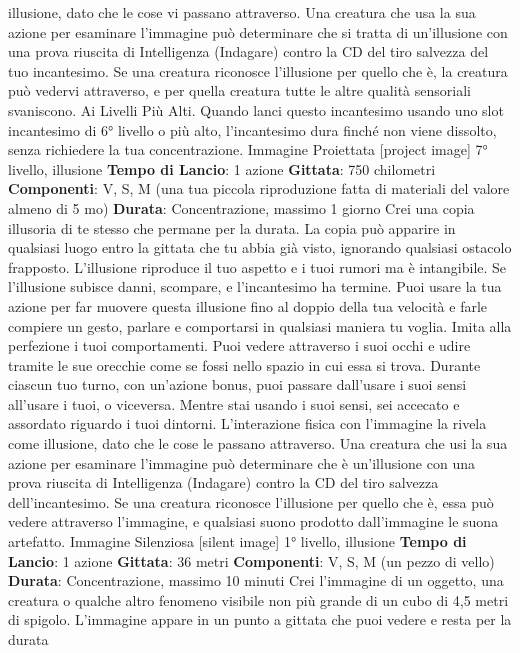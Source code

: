 \begin{multicols}{2}
illusione, dato che le cose vi passano attraverso. Una
creatura che usa la sua azione per esaminare
l’immagine può determinare che si tratta di un’illusione
con una prova riuscita di Intelligenza (Indagare) contro
la CD del tiro salvezza del tuo incantesimo. Se una
creatura riconosce l’illusione per quello che è, la
creatura può vedervi attraverso, e per quella creatura
tutte le altre qualità sensoriali svaniscono.
Ai Livelli Più Alti. Quando lanci questo incantesimo
usando uno slot incantesimo di 6° livello o più alto,
l’incantesimo dura finché non viene dissolto, senza
richiedere la tua concentrazione.
Immagine Proiettata
[project image]
7° livello, illusione
\textbf{Tempo di Lancio}: 1 azione
\textbf{Gittata}: 750 chilometri
\textbf{Componenti}: V, S, M (una tua piccola riproduzione
fatta di materiali del valore almeno di 5 mo)
\textbf{Durata}: Concentrazione, massimo 1 giorno
Crei una copia illusoria di te stesso che permane per la
durata. La copia può apparire in qualsiasi luogo entro la
gittata che tu abbia già visto, ignorando qualsiasi
ostacolo frapposto. L’illusione riproduce il tuo aspetto e
i tuoi rumori ma è intangibile. Se l’illusione subisce
danni, scompare, e l’incantesimo ha termine.
Puoi usare la tua azione per far muovere questa
illusione fino al doppio della tua velocità e farle
compiere un gesto, parlare e comportarsi in qualsiasi
maniera tu voglia. Imita alla perfezione i tuoi
comportamenti.
Puoi vedere attraverso i suoi occhi e udire tramite le
sue orecchie come se fossi nello spazio in cui essa si
trova. Durante ciascun tuo turno, con un’azione bonus,
puoi passare dall’usare i suoi sensi all’usare i tuoi, o
viceversa. Mentre stai usando i suoi sensi, sei accecato
e assordato riguardo i tuoi dintorni.
L’interazione fisica con l’immagine la rivela come
illusione, dato che le cose le passano attraverso. Una
creatura che usi la sua azione per esaminare
l’immagine può determinare che è un’illusione con una
prova riuscita di Intelligenza (Indagare) contro la CD del
tiro salvezza dell’incantesimo. Se una creatura
riconosce l’illusione per quello che è, essa può vedere
attraverso l’immagine, e qualsiasi suono prodotto
dall’immagine le suona artefatto.
Immagine Silenziosa
[silent image]
1° livello, illusione
\textbf{Tempo di Lancio}: 1 azione
\textbf{Gittata}: 36 metri
\textbf{Componenti}: V, S, M (un pezzo di vello)
\textbf{Durata}: Concentrazione, massimo 10 minuti
Crei l’immagine di un oggetto, una creatura o qualche
altro fenomeno visibile non più grande di un cubo di 4,5
metri di spigolo. L’immagine appare in un punto a
gittata che puoi vedere e resta per la durata

\end{multicols}
